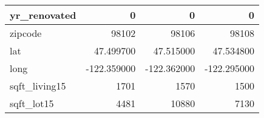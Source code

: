 \begin{table}[H]
\begin{tabular}{|l|r|r|r|}
\hline yr\_renovated & \cellcolor[rgb]{0.9, 0.54, 0.52} 0 & \cellcolor[rgb]{0.9, 0.54, 0.52} 0 & \cellcolor[rgb]{0.9, 0.54, 0.52} 0 \\
\hline zipcode & \cellcolor[rgb]{0.9, 0.54, 0.52} 98102 & 98106 & 98108 \\
\hline lat & \cellcolor[rgb]{0.9, 0.54, 0.52} 47.499700 & 47.515000 & 47.534800 \\
\hline long & \cellcolor[rgb]{0.9, 0.54, 0.52} -122.359000 & \cellcolor[rgb]{0.9, 0.54, 0.52} -122.362000 & \cellcolor[rgb]{0.9, 0.54, 0.52} -122.295000 \\
\hline sqft\_living15 & \cellcolor[rgb]{0.9, 0.54, 0.52} 1701 & 1570 & 1500 \\
\hline sqft\_lot15 & \cellcolor[rgb]{0.9, 0.54, 0.52} 4481 & 10880 & 7130 \\
\hline
\end{tabular}
\end{table}
